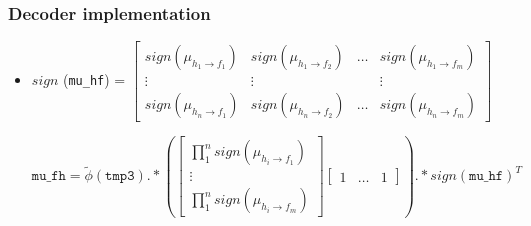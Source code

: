 \documentclass[]{beamer}
\begin{document}
\begin{frame}
\transwipe[direction=0]
\frametitle{Decoder implementation}
\begin{itemize}
\item[]$sign$ (\texttt{mu\_hf}) = 
		$\begin{bmatrix}
		sign(\mu_{h_1 \rightarrow f_1})  & sign(\mu_{h_1 \rightarrow f_2}) & \dots & sign(\mu_{h_1 \rightarrow f_m})\\
		\vdots & \vdots & & \vdots \\
		sign(\mu_{h_n \rightarrow f_1})& sign(\mu_{h_n \rightarrow f_2}) & \dots & sign(\mu_{h_n \rightarrow f_m}) 
		\end{bmatrix}$
		
		\begin{equation*}
		 \texttt{mu\_fh}= \tilde \phi (\texttt{tmp3}).*\left( \begin{bmatrix} \prod_1^n sign (\mu_{h_i \rightarrow f_1}) \\ \vdots \\ \prod_1^n sign(\mu_{h_i \rightarrow f_m}) \end{bmatrix} \begin{bmatrix} 1&\dots&1 \end{bmatrix}\right) .* sign(\texttt{mu\_hf})^T
		\end{equation*}
		
\end{itemize}
		
\end{frame}
\end{document}
